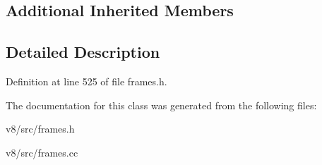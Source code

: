 \subsection*{Additional Inherited Members}


\subsection{Detailed Description}


Definition at line 525 of file frames.\+h.



The documentation for this class was generated from the following files\+:\begin{DoxyCompactItemize}
\item 
v8/src/frames.\+h\item 
v8/src/frames.\+cc\end{DoxyCompactItemize}
